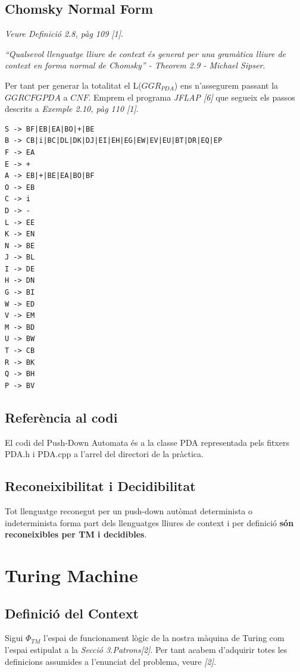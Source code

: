 \documentclass[12pt,a4paper]{report}
\def \pdaCFG{$GGRCFG{PDA} $}
\def \pda{$GGR_{PDA} $}
\def \contextTM{$\Phi_{TM}$}
\begin{document}
\section{Chomsky Normal Form}

\textit{Veure Definició 2.8, pàg 109 [1]}.

\textit{“Qualsevol llenguatge lliure de context és generat per una gramàtica lliure de context en forma normal de Chomsky” - Theorem 2.9 - Michael Sipser}.

Per tant per generar la totalitat el L(\pda{}) ens n’assegurem passant la \pdaCFG{} a $CNF$. Emprem el programa \textit{JFLAP [6]} que segueix els passos descrits a \textit{Exemple 2.10, pàg 110 [1]}.

\begin{lstlisting}
S -> BF|EB|EA|BO|+|BE
B -> CB|i|BC|DL|DK|DJ|EI|EH|EG|EW|EV|EU|BT|DR|EQ|EP
F -> EA
E -> +
A -> EB|+|BE|EA|BO|BF
O -> EB
C -> i
D -> -
L -> EE
K -> EN
N -> BE
J -> BL
I -> DE
H -> DN
G -> BI
W -> ED
V -> EM
M -> BD
U -> BW
T -> CB
R -> BK
Q -> BH
P -> BV
\end{lstlisting}

\section{Referència al codi}

El codi del Push-Down Automata és a la classe PDA representada pels fitxers PDA.h i PDA.cpp a l'arrel del directori de la pràctica.

\section{Reconeixibilitat i Decidibilitat}

Tot llenguatge reconegut per un push-down autòmat determinista o indeterminista forma part dels llenguatges lliures de context i per definició \textbf{són reconeixibles per TM i decidibles}.


\clearpage

\chapter{Turing Machine}

\section{Definició del Context}

Sigui \contextTM{} l'espai de funcionament lògic de la nostra màquina de Turing com l'espai estipulat a la \textit{Secció 3.Patrons[2]}. Per tant acabem d'adquirir totes les definicions assumides a l'enunciat del problema, veure \textit{[2]}.
\end{document}
